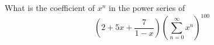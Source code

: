 What is the coefficient of $x^n$ in the power series of
\[
\left( 
2 + 5x + \frac{7}{1 - x}
\right)
\left( \sum_{n=0}^\infty x^n \right)^{100} 
\]
